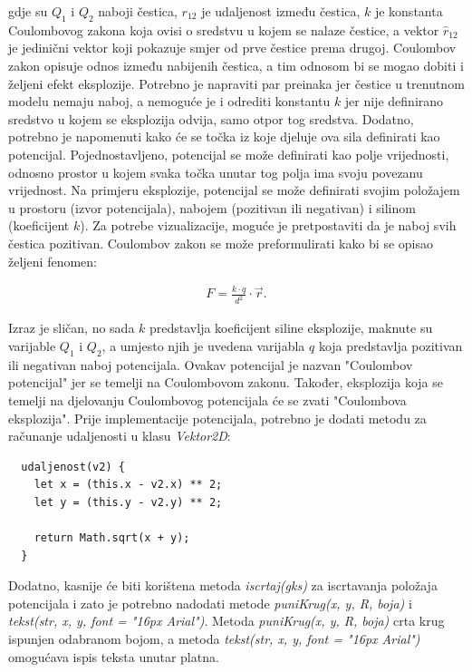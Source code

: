 \documentclass{foi}
\begin{document}
gdje su $Q_1$ i $Q_2$ naboji čestica, $r_{12}$ je udaljenost između čestica, $k$ je konstanta Coulombovog zakona koja ovisi o sredstvu u kojem se nalaze čestice, a vektor $\hat{r}_{12}$ je jedinični vektor koji pokazuje smjer od prve čestice prema drugoj. Coulombov zakon opisuje odnos između nabijenih čestica, a tim odnosom bi se mogao dobiti i željeni efekt eksplozije. Potrebno je napraviti par preinaka jer čestice u trenutnom modelu nemaju naboj, a nemoguće je i odrediti konstantu $k$ jer nije definirano sredstvo u kojem se eksplozija odvija, samo otpor tog sredstva. Dodatno, potrebno je napomenuti kako će se točka iz koje djeluje ova sila definirati kao potencijal. Pojednostavljeno, potencijal se može definirati kao polje vrijednosti, odnosno prostor u kojem svaka točka unutar tog polja ima svoju povezanu vrijednost. Na primjeru eksplozije, potencijal se može definirati svojim položajem u prostoru (izvor potencijala), nabojem (pozitivan ili negativan) i silinom (koeficijent $k$). Za potrebe vizualizacije, moguće je pretpostaviti da je naboj svih čestica pozitivan. Coulombov zakon se može preformulirati kako bi se opisao željeni fenomen:

 \begin{align*}
F = \frac{k\cdot q}{d^2}\cdot \Vec{r}.
\end{align*}

Izraz je sličan, no sada $k$ predstavlja koeficijent siline eksplozije, maknute su varijable $Q_1$ i $Q_2$, a umjesto njih je uvedena varijabla $q$ koja predstavlja pozitivan ili negativan naboj potencijala. Ovakav potencijal je nazvan "Coulombov potencijal" jer se temelji na Coulombovom zakonu. Također, eksplozija koja se temelji na djelovanju Coulombovog potencijala će se zvati "Coulombova eksplozija". Prije implementacije potencijala, potrebno je dodati metodu za računanje udaljenosti u klasu \textit{Vektor2D}:

\begin{verbatim}
  udaljenost(v2) {
    let x = (this.x - v2.x) ** 2;
    let y = (this.y - v2.y) ** 2;

    return Math.sqrt(x + y);
  }
\end{verbatim}

Dodatno, kasnije će biti korištena metoda \textit{iscrtaj(gks)} za iscrtavanja položaja potencijala i zato je potrebno nadodati metode \textit{puniKrug(x, y, R, boja)} i \textit{tekst(str, x, y, font = "16px Arial")}. Metoda \textit{puniKrug(x, y, R, boja)} crta krug ispunjen odabranom bojom, a metoda \textit{tekst(str, x, y, font = "16px Arial")} omogućava ispis teksta unutar platna.
\end{document}
